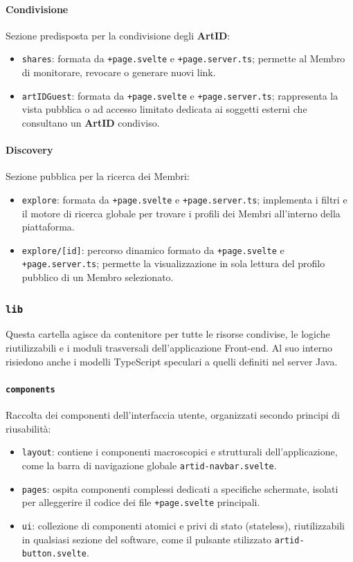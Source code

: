 \paragraph{Condivisione}
Sezione predisposta per la condivisione degli \textbf{ArtID}:
\begin{itemize}
    \item \texttt{shares}: formata da \texttt{+page.svelte} e \texttt{+page.server.ts}; permette al Membro di monitorare, revocare o generare nuovi link.
    \item \texttt{artIDGuest}: formata da \texttt{+page.svelte} e \texttt{+page.server.ts}; rappresenta la vista pubblica o ad accesso limitato dedicata ai soggetti esterni che consultano un \textbf{ArtID} condiviso.
\end{itemize}

\paragraph{Discovery}
Sezione pubblica per la ricerca dei Membri:
\begin{itemize}
    \item \texttt{explore}: formata da \texttt{+page.svelte} e \texttt{+page.server.ts}; implementa i filtri e il motore di ricerca globale per trovare i profili dei Membri all'interno della piattaforma.
    \item \texttt{explore/[id]}: percorso dinamico formato da \texttt{+page.svelte} e \texttt{+page.server.ts}; permette la visualizzazione in sola lettura del profilo pubblico di un Membro selezionato.
\end{itemize}

\subsubsection{\texttt{lib}}
Questa cartella agisce da contenitore per tutte le risorse condivise, le logiche riutilizzabili e i moduli trasversali dell'applicazione Front-end. Al suo interno risiedono anche i modelli TypeScript speculari a quelli definiti nel server Java.

\paragraph{\texttt{components}}
Raccolta dei componenti dell'interfaccia utente, organizzati secondo principi di riusabilità:
\begin{itemize}
    \item \texttt{layout}: contiene i componenti macroscopici e strutturali dell'applicazione, come la barra di navigazione globale \texttt{artid-navbar.svelte}.
    \item \texttt{pages}: ospita componenti complessi dedicati a specifiche schermate, isolati per alleggerire il codice dei file \texttt{+page.svelte} principali.
    \item \texttt{ui}: collezione di componenti atomici e privi di stato (stateless), riutilizzabili in qualsiasi sezione del software, come il pulsante stilizzato \texttt{artid-button.svelte}.
\end{itemize}

